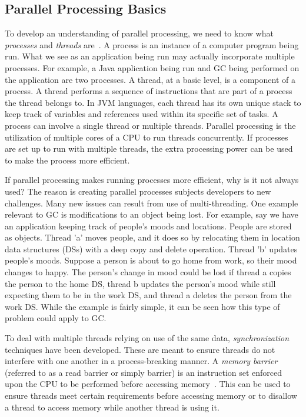 \documentclass{sig-alternate}
\begin{document}
\subsection{Parallel Processing Basics}
\label{sec:parallelProcessing}

To develop an understanding of parallel processing, we need to know 
what \emph{processes} and \emph{threads} are~\cite{oracle:threads}.
A process is an instance of a computer program being run. What we
see as an application being run may actually incorporate multiple processes.
For example, a Java application being run and GC being performed on the application are two processes.
A thread, at a basic level, is a component of a process. A thread performs a sequence
of instructions that are part of a process the thread belongs to. In JVM languages,
each thread has its own unique stack to keep track of variables
and references used within its specific set of tasks. A process
can involve a single thread or multiple threads.
Parallel processing is the utilization of multiple
cores of a CPU to run threads concurrently. If processes are set up
to run with multiple threads, the extra processing power can be used to make 
the process more efficient.

If parallel processing makes running processes more efficient, why is it not
always used? The reason is creating parallel processes subjects
developers to new challenges. Many new issues can result from use of
multi-threading. One example relevant to GC is modifications to an 
object being lost. For example, say we have an application keeping 
track of people's moods and locations. People are stored as objects. 
Thread 'a' moves people, and it does so by relocating them in location data structures (DSs) 
with a deep copy and delete operation. Thread 'b' updates people's moods. Suppose a person
is about to go home from work, so their mood changes to happy.
The person's change in mood could be lost if thread a copies the person
to the home DS, thread b updates the person's mood while still expecting
them to be in the work DS, and thread a deletes the person from the work DS. 
While the example is fairly simple, it can be seen how this type of problem
could apply to GC.

To deal with multiple threads relying on use of the same data, \emph{synchronization}
techniques have been developed. These are meant to ensure threads do not interfere
with one another in a process-breaking manner. A \emph{memory barrier} (referred to 
as a read barrier or simply barrier) is an instruction set enforced upon the 
CPU to be performed before accessing memory~\cite{wiki:barrier}. This can be used to ensure threads
meet certain requirements before accessing memory or to disallow a thread to
access memory while another thread is using it.
 
\end{document}
